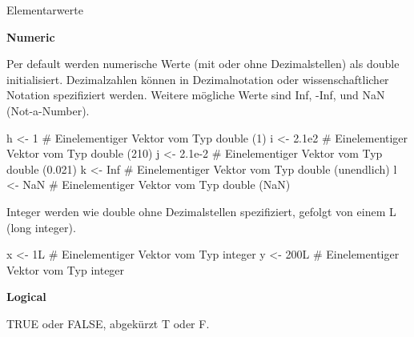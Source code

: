 \documentclass[
  8pt,
  ignorenonframetext,
]{beamer}
\newenvironment{Shaded}{\begin{snugshade}}{\end{snugshade}}
\newcommand{\CommentTok}[1]{\textcolor[rgb]{0.37,0.37,0.37}{#1}}
\newcommand{\ConstantTok}[1]{\textcolor[rgb]{0.56,0.35,0.01}{#1}}
\newcommand{\DecValTok}[1]{\textcolor[rgb]{0.68,0.00,0.00}{#1}}
\newcommand{\FloatTok}[1]{\textcolor[rgb]{0.68,0.00,0.00}{#1}}
\newcommand{\NormalTok}[1]{\textcolor[rgb]{0.00,0.23,0.31}{#1}}
\newcommand{\OtherTok}[1]{\textcolor[rgb]{0.00,0.23,0.31}{#1}}
\begin{document}
\begin{frame}[fragile]{Elementarwerte}
\protect\hypertarget{elementarwerte}{}
\small

\textbf{Numeric}

\footnotesize

Per default werden numerische Werte (mit oder ohne Dezimalstellen) als
double initialisiert. Dezimalzahlen können in Dezimalnotation oder
wissenschaftlicher Notation spezifiziert werden. Weitere mögliche Werte
sind Inf, -Inf, und NaN (Not-a-Number). \vspace{1mm} \tiny

\begin{Shaded}
\begin{Highlighting}[]
\NormalTok{h }\OtherTok{\textless{}{-}} \DecValTok{1}                    \CommentTok{\# Einelementiger Vektor vom Typ double (1)}
\NormalTok{i }\OtherTok{\textless{}{-}} \FloatTok{2.1e2}                \CommentTok{\# Einelementiger Vektor vom Typ double (210)}
\NormalTok{j }\OtherTok{\textless{}{-}} \FloatTok{2.1e{-}2}               \CommentTok{\# Einelementiger Vektor vom Typ double (0.021)}
\NormalTok{k }\OtherTok{\textless{}{-}} \ConstantTok{Inf}                  \CommentTok{\# Einelementiger Vektor vom Typ double (unendlich)}
\NormalTok{l }\OtherTok{\textless{}{-}} \ConstantTok{NaN}                  \CommentTok{\# Einelementiger Vektor vom Typ double (NaN)}
\end{Highlighting}
\end{Shaded}

\footnotesize

Integer werden wie double ohne Dezimalstellen spezifiziert, gefolgt von
einem L (long integer). \vspace{1mm} \tiny

\begin{Shaded}
\begin{Highlighting}[]
\NormalTok{x }\OtherTok{\textless{}{-}}\NormalTok{ 1L                   }\CommentTok{\# Einelementiger Vektor vom Typ integer}
\NormalTok{y }\OtherTok{\textless{}{-}}\NormalTok{ 200L                 }\CommentTok{\# Einelementiger Vektor vom Typ integer}
\end{Highlighting}
\end{Shaded}

\small

\textbf{Logical}

\footnotesize

TRUE oder FALSE, abgekürzt T oder F. \vspace{1mm} \tiny


\end{frame}
\end{document}
